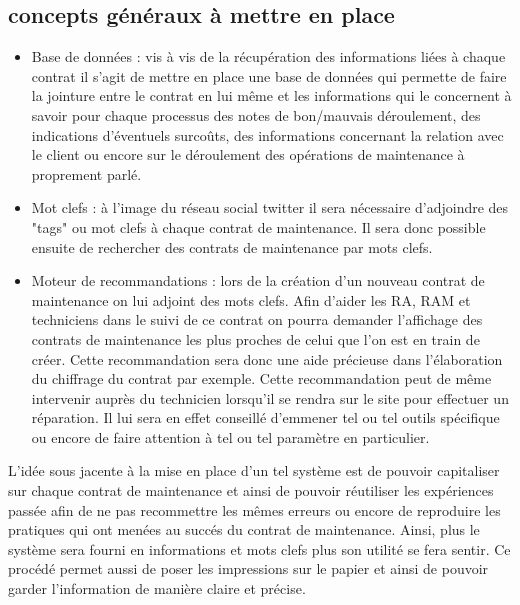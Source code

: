 \subsection {concepts généraux à mettre en place}
\begin{itemize}
\item Base de données : vis à vis de la récupération des informations liées à chaque contrat il s'agit de mettre en place une base de données qui permette de faire la jointure entre le contrat en lui même et les informations qui le concernent à savoir pour chaque processus des notes de bon/mauvais déroulement, des indications d'éventuels surcoûts, des informations concernant la relation avec le client ou encore sur le déroulement des opérations de maintenance à proprement parlé. 
\item Mot clefs : à l'image du réseau social twitter il sera nécessaire d'adjoindre des "tags" ou mot clefs à chaque contrat de maintenance. Il sera donc possible ensuite de rechercher des contrats de maintenance par mots clefs.
\item Moteur de recommandations : lors de la création d'un nouveau contrat de maintenance on lui adjoint des mots clefs. Afin d'aider les RA, RAM et techniciens dans le suivi de ce contrat on pourra demander l'affichage des contrats de maintenance les plus proches de celui que l'on est en train de créer. Cette recommandation sera donc une aide précieuse dans l'élaboration du chiffrage du contrat par exemple. Cette recommandation peut de même intervenir auprès du technicien lorsqu'il se rendra sur le site pour effectuer un réparation. Il lui sera en effet conseillé d'emmener tel ou tel outils spécifique ou encore de faire attention à tel ou tel paramètre en particulier.
\end{itemize}
L'idée sous jacente à la mise en place d'un tel système est de pouvoir capitaliser sur chaque contrat de maintenance et ainsi de pouvoir réutiliser les expériences passée afin de ne pas recommettre les mêmes erreurs ou encore de reproduire les pratiques qui ont menées au succés du contrat de maintenance. Ainsi, plus le système sera fourni en informations et mots clefs plus son utilité se fera sentir. Ce procédé permet aussi de \og poser les impressions sur le papier \fg et ainsi de pouvoir garder l'information de manière claire et précise.



